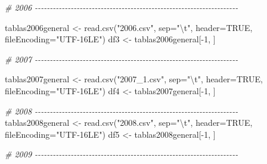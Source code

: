 \documentclass[
]{article}
\newenvironment{Shaded}{\begin{snugshade}}{\end{snugshade}}
\newcommand{\AttributeTok}[1]{\textcolor[rgb]{0.77,0.63,0.00}{#1}}
\newcommand{\CommentTok}[1]{\textcolor[rgb]{0.56,0.35,0.01}{\textit{#1}}}
\newcommand{\ConstantTok}[1]{\textcolor[rgb]{0.00,0.00,0.00}{#1}}
\newcommand{\DecValTok}[1]{\textcolor[rgb]{0.00,0.00,0.81}{#1}}
\newcommand{\FunctionTok}[1]{\textcolor[rgb]{0.00,0.00,0.00}{#1}}
\newcommand{\NormalTok}[1]{#1}
\newcommand{\OtherTok}[1]{\textcolor[rgb]{0.56,0.35,0.01}{#1}}
\newcommand{\SpecialCharTok}[1]{\textcolor[rgb]{0.00,0.00,0.00}{#1}}
\newcommand{\StringTok}[1]{\textcolor[rgb]{0.31,0.60,0.02}{#1}}
\begin{document}
\begin{Shaded}
\begin{Highlighting}[]
\CommentTok{\# 2006 {-}{-}{-}{-}{-}{-}{-}{-}{-}{-}{-}{-}{-}{-}{-}{-}{-}{-}{-}{-}{-}{-}{-}{-}{-}{-}{-}{-}{-}{-}{-}{-}{-}{-}{-}{-}{-}{-}{-}{-}{-}{-}{-}{-}{-}{-}{-}{-}{-}{-}{-}{-}{-}{-}{-}{-}{-}{-}{-}{-}{-}{-}{-}{-}{-}{-}{-}{-}}

\NormalTok{tablas2006general }\OtherTok{\textless{}{-}} \FunctionTok{read.csv}\NormalTok{(}\StringTok{"2006.csv"}\NormalTok{, }\AttributeTok{sep=}\StringTok{"}\SpecialCharTok{\textbackslash{}t}\StringTok{"}\NormalTok{, }\AttributeTok{header=}\ConstantTok{TRUE}\NormalTok{, }\AttributeTok{fileEncoding=}\StringTok{"UTF{-}16LE"}\NormalTok{)}
\NormalTok{df3 }\OtherTok{\textless{}{-}}\NormalTok{ tablas2006general[}\SpecialCharTok{{-}}\DecValTok{1}\NormalTok{, ]}


\CommentTok{\# 2007 {-}{-}{-}{-}{-}{-}{-}{-}{-}{-}{-}{-}{-}{-}{-}{-}{-}{-}{-}{-}{-}{-}{-}{-}{-}{-}{-}{-}{-}{-}{-}{-}{-}{-}{-}{-}{-}{-}{-}{-}{-}{-}{-}{-}{-}{-}{-}{-}{-}{-}{-}{-}{-}{-}{-}{-}{-}{-}{-}{-}{-}{-}{-}{-}{-}{-}{-}{-}}

\NormalTok{tablas2007general }\OtherTok{\textless{}{-}} \FunctionTok{read.csv}\NormalTok{(}\StringTok{"2007\_1.csv"}\NormalTok{, }\AttributeTok{sep=}\StringTok{"}\SpecialCharTok{\textbackslash{}t}\StringTok{"}\NormalTok{, }\AttributeTok{header=}\ConstantTok{TRUE}\NormalTok{, }\AttributeTok{fileEncoding=}\StringTok{"UTF{-}16LE"}\NormalTok{)}
\NormalTok{df4 }\OtherTok{\textless{}{-}}\NormalTok{ tablas2007general[}\SpecialCharTok{{-}}\DecValTok{1}\NormalTok{, ]}


\CommentTok{\# 2008 {-}{-}{-}{-}{-}{-}{-}{-}{-}{-}{-}{-}{-}{-}{-}{-}{-}{-}{-}{-}{-}{-}{-}{-}{-}{-}{-}{-}{-}{-}{-}{-}{-}{-}{-}{-}{-}{-}{-}{-}{-}{-}{-}{-}{-}{-}{-}{-}{-}{-}{-}{-}{-}{-}{-}{-}{-}{-}{-}{-}{-}{-}{-}{-}{-}{-}{-}{-}}
\NormalTok{tablas2008general }\OtherTok{\textless{}{-}} \FunctionTok{read.csv}\NormalTok{(}\StringTok{"2008.csv"}\NormalTok{, }\AttributeTok{sep=}\StringTok{"}\SpecialCharTok{\textbackslash{}t}\StringTok{"}\NormalTok{, }\AttributeTok{header=}\ConstantTok{TRUE}\NormalTok{, }\AttributeTok{fileEncoding=}\StringTok{"UTF{-}16LE"}\NormalTok{)}
\NormalTok{df5 }\OtherTok{\textless{}{-}}\NormalTok{ tablas2008general[}\SpecialCharTok{{-}}\DecValTok{1}\NormalTok{, ]}


\CommentTok{\# 2009 {-}{-}{-}{-}{-}{-}{-}{-}{-}{-}{-}{-}{-}{-}{-}{-}{-}{-}{-}{-}{-}{-}{-}{-}{-}{-}{-}{-}{-}{-}{-}{-}{-}{-}{-}{-}{-}{-}{-}{-}{-}{-}{-}{-}{-}{-}{-}{-}{-}{-}{-}{-}{-}{-}{-}{-}{-}{-}{-}{-}{-}{-}{-}{-}{-}{-}{-}{-}}


\end{Highlighting}
\end{Shaded}
\end{document}
